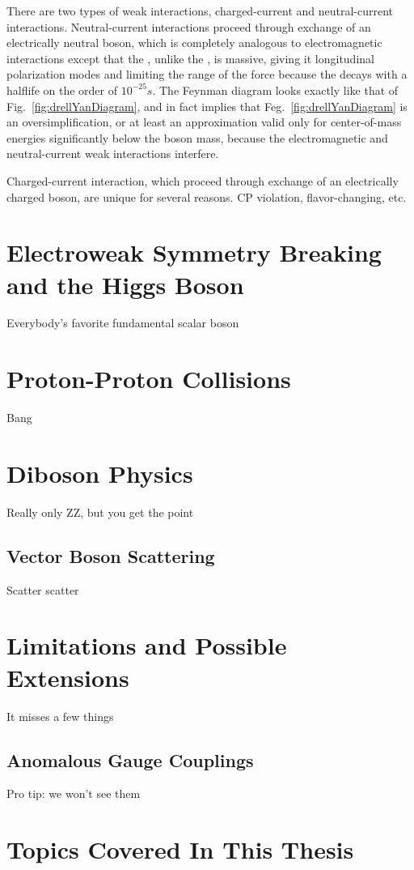 There are two types of weak interactions, charged-current and neutral-current interactions.
Neutral-current interactions proceed through exchange of an electrically neutral {\PZ} boson, which is completely analogous to electromagnetic interactions except that the {\PZ}, unlike the {\Pa}, is massive, giving it longitudinal polarization modes and limiting the range of the force because the {\PZ} decays with a halflife on the order of $10^{-25}\unit{s}$.
The Feynman diagram looks exactly like that of Fig.~\ref{fig:drellYanDiagram}, and in fact implies that Feg.~\ref{fig:drellYanDiagram} is an oversimplification, or at least an approximation valid only for center-of-mass energies significantly below the {\PZ} boson mass, because the electromagnetic and neutral-current weak interactions interfere.

Charged-current interaction, which proceed through exchange of an electrically charged {\PW} boson, are unique for several reasons.
CP violation, flavor-changing, etc.



\section{Electroweak Symmetry Breaking and the Higgs Boson}
Everybody's favorite fundamental scalar boson



\section{Proton-Proton Collisions}\label{sec:pp}
Bang



\section{Diboson Physics}
Really only ZZ, but you get the point

\subsection{Vector Boson Scattering}
Scatter scatter


\section{Limitations and Possible Extensions}
It misses a few things

\subsection{Anomalous Gauge Couplings}
Pro tip: we won't see them



\section{Topics Covered In This Thesis}

